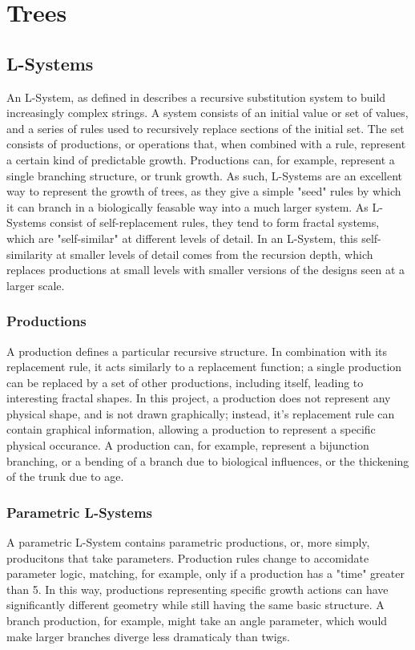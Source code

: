 \documentclass{article}
\newcommand{\tab}{\hspace*{2em}}
\begin{document}
    \section{Trees}
        \subsection{L-Systems}
    \tab An L-System, as defined in \cite{abp96} describes a recursive substitution system to
build increasingly complex strings. A system consists of an initial value or set of values, and a
series of rules used to recursively replace sections of the initial set. The set consists of
productions, or operations that, when combined with a rule, represent a certain kind of predictable
growth. Productions can, for example, represent a single branching structure, or trunk growth. As
such, L-Systems are an excellent way to represent the growth of trees, as they give a simple "seed"
rules by which it can branch in a biologically feasable way into a much larger system. As L-Systems
consist of self-replacement rules, they tend to form fractal systems, which are "self-similar" at
different levels of detail. In an L-System, this self-similarity at smaller levels of detail comes
from the recursion depth, which replaces productions at small levels with smaller versions of the
designs seen at a larger scale.


            \subsubsection{Productions}
    \tab A production defines a particular recursive structure. In combination with its replacement
rule, it acts similarly to a replacement function; a single production can be replaced by a set of
other productions, including itself, leading to interesting fractal shapes. In this project, a
production does not represent any physical shape, and is not drawn graphically; instead, it's 
replacement rule can contain graphical information, allowing a production to represent a specific
physical occurance. A production can, for example, represent a bijunction branching, or a bending
of a branch due to biological influences, or the thickening of the trunk due to age.

            \subsubsection{Parametric L-Systems}
    \tab A parametric L-System contains parametric productions, or, more simply, producitons that
take parameters. Production rules change to accomidate parameter logic, matching, for example, only
if a production has a "time" greater than 5. In this way, productions representing specific growth
actions can have significantly different geometry while still having the same basic structure. A
branch production, for example, might take an angle parameter, which would make larger branches
diverge less dramaticaly than twigs.
\end{document}
